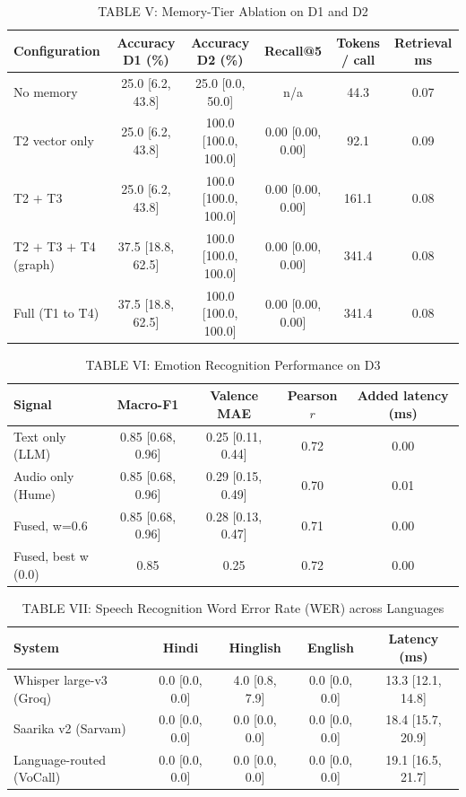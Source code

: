 \begin{table}[t]
\centering
\caption{TABLE V: Memory-Tier Ablation on D1 and D2}
\label{tab:memory_ablation}
\begin{tabular}{lccccc}
\toprule
Configuration & Accuracy D1 (\%) & Accuracy D2 (\%) & Recall@5 & Tokens / call & Retrieval ms \\
\midrule
No memory & 25.0 [6.2, 43.8] & 25.0 [0.0, 50.0] & n/a & 44.3 & 0.07 \\
T2 vector only & 25.0 [6.2, 43.8] & 100.0 [100.0, 100.0] & 0.00 [0.00, 0.00] & 92.1 & 0.09 \\
T2 $+$ T3 & 25.0 [6.2, 43.8] & 100.0 [100.0, 100.0] & 0.00 [0.00, 0.00] & 161.1 & 0.08 \\
T2 $+$ T3 $+$ T4 (graph) & 37.5 [18.8, 62.5] & 100.0 [100.0, 100.0] & 0.00 [0.00, 0.00] & 341.4 & 0.08 \\
Full (T1 to T4) & 37.5 [18.8, 62.5] & 100.0 [100.0, 100.0] & 0.00 [0.00, 0.00] & 341.4 & 0.08 \\
\bottomrule
\end{tabular}
\end{table}

\begin{table}[t]
\centering
\caption{TABLE VI: Emotion Recognition Performance on D3}
\label{tab:emotion_recognition}
\begin{tabular}{lcccc}
\toprule
Signal & Macro-F1 & Valence MAE & Pearson $r$ & Added latency (ms) \\
\midrule
Text only (LLM) & 0.85 [0.68, 0.96] & 0.25 [0.11, 0.44] & 0.72 & 0.00 \\
Audio only (Hume) & 0.85 [0.68, 0.96] & 0.29 [0.15, 0.49] & 0.70 & 0.01 \\
Fused, w=0.6 & 0.85 [0.68, 0.96] & 0.28 [0.13, 0.47] & 0.71 & 0.00 \\
Fused, best w (0.0) & 0.85 & 0.25 & 0.72 & 0.00 \\
\bottomrule
\end{tabular}
\end{table}

\begin{table}[t]
\centering
\caption{TABLE VII: Speech Recognition Word Error Rate (WER) across Languages}
\label{tab:speech_wer}
\begin{tabular}{lcccc}
\toprule
System & Hindi & Hinglish & English & Latency (ms) \\
\midrule
Whisper large-v3 (Groq) & 0.0 [0.0, 0.0] & 4.0 [0.8, 7.9] & 0.0 [0.0, 0.0] & 13.3 [12.1, 14.8] \\
Saarika v2 (Sarvam) & 0.0 [0.0, 0.0] & 0.0 [0.0, 0.0] & 0.0 [0.0, 0.0] & 18.4 [15.7, 20.9] \\
Language-routed (VoCall) & 0.0 [0.0, 0.0] & 0.0 [0.0, 0.0] & 0.0 [0.0, 0.0] & 19.1 [16.5, 21.7] \\
\bottomrule
\end{tabular}
\end{table}

